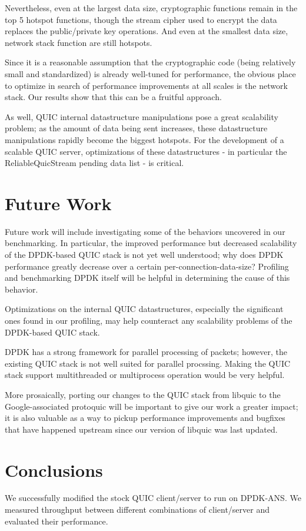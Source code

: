 \documentclass{sig-alternate-05-2015}
\begin{document}
Nevertheless, even at the largest data size,
cryptographic functions remain in the top 5 hotspot functions,
though the stream cipher used to encrypt the data replaces the public/private key operations.
And even at the smallest data size,
network stack function are still hotspots.

Since it is a reasonable assumption that the cryptographic code 
(being relatively small and standardized)
is already well-tuned for performance,
the obvious place to optimize in search of performance improvements at all scales is the network stack.
Our results show that this can be a fruitful approach.

As well, QUIC internal datastructure manipulations pose a great scalability problem;
as the amount of data being sent increases,
these datastructure manipulations rapidly become the biggest hotspots.
For the development of a scalable QUIC server, optimizations of these datastructures
- in particular the ReliableQuicStream pending data list -
is critical.

\section{Future Work}

Future work will include investigating some of the behaviors uncovered in our benchmarking.
In particular, the improved performance but decreased scalability of the DPDK-based QUIC stack
is not yet well understood;
why does DPDK performance greatly decrease over a certain per-connection-data-size?
Profiling and benchmarking DPDK itself will be helpful in determining the cause of this behavior.

Optimizations on the internal QUIC datastructures,
especially the significant ones found in our profiling,
may help counteract any scalability problems of the DPDK-based QUIC stack.

DPDK has a strong framework for parallel processing of packets;
however, the existing QUIC stack is not well suited for parallel procssing.
Making the QUIC stack support multithreaded or multiprocess operation would be very helpful.

More prosaically, porting our changes to the QUIC stack from libquic
to the Google-associated protoquic
will be important to give our work a greater impact;
it is also valuable as a way to pickup performance improvements and bugfixes that have happened upstream
since our version of libquic was last updated.

\section{Conclusions}
We successfully modified the stock QUIC client/server to run on DPDK-ANS. We measured throughput between different combinations of client/server and evaluated their performance.
\end{document}
